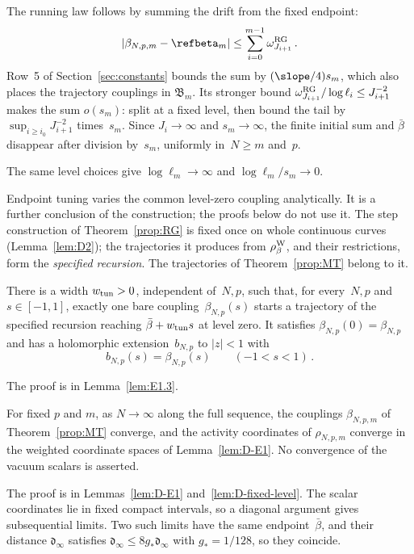 The running law follows by summing the drift from the fixed endpoint:
\begin{equation}\label{eq:I12-drift-sum}
|\beta_{N,p,m}-\refbeta_m|\le\sum_{i=0}^{m-1}\omega_{J_{i+1}}^{\rm RG}\,.
\end{equation}
Row~5 of Section~\ref{sec:constants} bounds the sum by $(\slope/4)s_m$, which also places the trajectory couplings in $\mathfrak B_m$. Its stronger bound $\omega_{J_{i+1}}^{\rm RG}/\log\ell_i\le J_{i+1}^{-2}$ makes the sum $o(s_m)$: split at a fixed level, then bound the tail by $\sup_{i\ge i_0}J_{i+1}^{-2}$ times~$s_m$. Since $J_i\to\infty$ and $s_m\to\infty$, the finite initial sum and $\bar\beta$ disappear after division by~$s_m$, uniformly in~$N\ge m$ and~$p$.

The same level choices give $\log\ell_m\to\infty$ and $\log\ell_m/s_m\to0$.

Endpoint tuning varies the common level-zero coupling analytically. It is a further conclusion of the construction; the proofs below do not use it.
The step construction of Theorem~\ref{prop:RG} is fixed once on whole continuous curves (Lemma~\ref{lem:D2}); the trajectories it produces from $\rho^{\rm W}_\beta$, and their restrictions, form the \emph{specified recursion}. The trajectories of Theorem~\ref{prop:MT} belong to it.

\begin{proposition}\label{prop:endpoint-tuning}
There is a width $w_{\rm tun}>0$, independent of~$N,p$, such that, for every~$N,p$ and $s\in[-1,1]$, exactly one bare coupling~$\beta_{N,p}(s)$ starts a trajectory of the specified recursion reaching $\bar\beta+w_{\rm tun}s$ at level zero. It satisfies $\beta_{N,p}(0)=\beta_{N,p}$ and has a holomorphic extension~$b_{N,p}$ to $|z|<1$ with
\begin{equation}\label{eq:I12-endpoint-tuning}
b_{N,p}(s)=\beta_{N,p}(s)\qquad(-1<s<1)\,.
\end{equation}
\end{proposition}
The proof is in Lemma~\ref{lem:E1.3}.

\begin{proposition}\label{prop:fixed-level}
For fixed $p$ and $m$, as $N\to\infty$ along the full sequence, the couplings $\beta_{N,p,m}$ of
Theorem~\ref{prop:MT} converge, and the activity coordinates of $\rho_{N,p,m}$ converge in the
weighted coordinate spaces of Lemma~\ref{lem:D-E1}. No convergence of the vacuum scalars is asserted.
\end{proposition}
The proof is in Lemmas~\ref{lem:D-E1} and~\ref{lem:D-fixed-level}. The scalar coordinates lie in fixed
compact intervals, so a diagonal argument gives subsequential limits. Two such limits have the same
endpoint~$\bar\beta$, and their distance $\mathfrak d_\infty$ satisfies
$\mathfrak d_\infty\le8g_*\mathfrak d_\infty$ with $g_*=1/128$, so they coincide.

